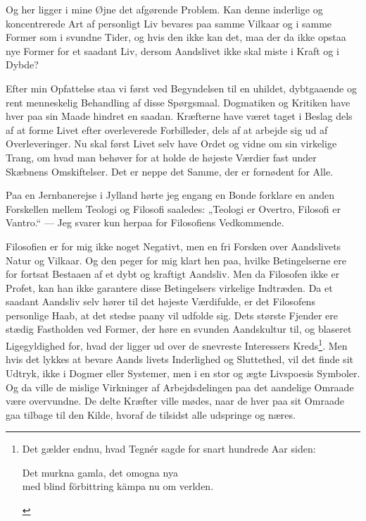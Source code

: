 \documentclass[12pt,a4paper,openany]{book}
\newcommand{\opage}[1]{\marginnote{\footnotesize\textit{[#1]}}}
\begin{document}
Og her ligger i mine Øjne det afgørende Problem. Kan
denne inderlige og koncentrerede Art af personligt Liv bevares
paa samme Vilkaar og i samme Former som i svundne Tider,
og hvis den ikke kan det, maa der da ikke opstaa nye Former
for et saadant Liv, dersom Aandslivet ikke skal miste i Kraft
og i Dybde?

Efter min Opfattelse staa vi først ved Begyndelsen til en
uhildet, dybtgaaende og rent menneskelig Behandling af disse
Spørgsmaal. Dogmatiken og Kritiken have hver paa sin Maade
hindret en saadan. Kræfterne have været taget i Beslag dels
af at forme Livet efter overleverede Forbilleder, dels af at arbejde
sig ud af Overleveringer. Nu skal først Livet selv have
Ordet og vidne om sin virkelige Trang, om hvad man behøver
for at holde de højeste Værdier fast under Skæbnens Omskiftelser.
Det er neppe det Samme, der er fornødent for Alle.

Paa en Jernbanerejse i Jylland hørte jeg engang en Bonde
forklare en anden Forskellen mellem Teologi og Filosofi saaledes:
„Teologi er Overtro, Filosofi er Vantro.“ --- Jeg svarer
kun herpaa for Filosofiens Vedkommende.

Filosofien er for mig ikke noget Negativt, men en fri
Forsken over Aandslivets Natur og Vilkaar. Og den peger for
mig klart hen paa, hvilke Betingelserne ere for fortsat Bestaaen
af et dybt og kraftigt Aandsliv. Men da Filosofen ikke
er Profet, kan han ikke garantere disse Betingelsers virkelige
Indtræden. Da et saadant Aandsliv selv hører til det højeste
Værdifulde, er det Filosofens personlige Haab, at det stedse
paany vil udfolde sig. Dets største Fjender ere stædig Fastholden
ved Former, der høre en svunden Aandskultur til, og
blaseret Ligegyldighed for, hvad der ligger ud over de snevreste
Interessers Kreds\footnote[1]{Det gælder endnu, hvad Tegnér sagde for snart hundrede Aar siden: \begin{center}Det murkna gamla, det omogna nya\\ med blind förbittring kämpa nu om verlden.\end{center}}. Men hvis det lykkes at bevare Aands%
\setcounter{footnote}{0}%
\opage{17}livets Inderlighed og Sluttethed, vil det finde sit Udtryk, ikke
i Dogmer eller Systemer, men i en stor og ægte Livspoesis
Symboler. Og da ville de mislige Virkninger af Arbejdsdelingen
paa det aandelige Omraade være overvundne. De
delte Kræfter ville mødes, naar de hver paa sit Omraade gaa
tilbage til den Kilde, hvoraf de tilsidst alle udspringe og næres.
\end{document}
